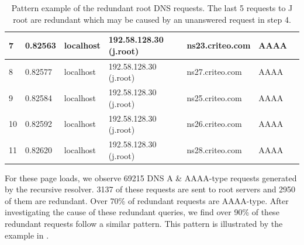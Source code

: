 \documentclass[sigconf,letterpaper,nonacm,10pt,anonymous]{acmart}
\begin{document}
\begin{table}[]
{\begin{tabular}{|l|l|l|l|l|l|l|}
7             & 0.82563                              & localhost             & 192.58.128.30 (j.root)         & ns23.criteo.com     & AAAA                &                                                                                                                                                \\ \hline
8             & 0.82577                              & localhost             & 192.58.128.30 (j.root)         & ns27.criteo.com     & AAAA                &                                                                                                                                                \\ \hline
9             & 0.82584                              & localhost             & 192.58.128.30 (j.root)         & ns25.criteo.com     & AAAA                &                                                                                                                                                \\ \hline
10            & 0.82592                              & localhost             & 192.58.128.30 (j.root)         & ns26.criteo.com     & AAAA                &                                                                                                                                                \\ \hline
11            & 0.82620                              & localhost             & 192.58.128.30 (j.root)         & ns28.criteo.com     & AAAA                &                                                                                                                                                \\ \hline
\end{tabular}%
}
\caption{Pattern example of the redundant root DNS requests. The last 5 requests to J root are redundant which may be caused by an unanswered request in step 4.}
\label{tab:redundant_example}
\end{table}

For these page loads, we observe 69215 DNS A \& AAAA-type requests
generated by the recursive resolver. 3137 of these requests are sent to
root servers and 2950 of them are redundant. Over 70\% of redundant
requests are AAAA-type. After investigating the cause of these redundant
queries, we find over 90\% of these redundant requests follow a similar
pattern. This pattern is illustrated by the example in
.
\end{document}

